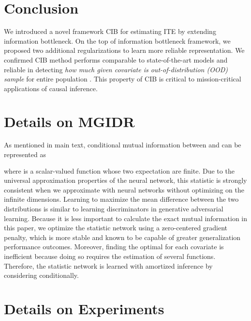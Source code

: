 \documentclass{article}
\begin{document}
\section{Conclusion}
    \vspace{-.15cm}
    We introduced a novel framework CIB for estimating ITE by extending information bottleneck. On the top of information bottleneck framework, we proposed two additional regularizations to learn more reliable representation. We confirmed CIB method performs comparable to state-of-the-art models and reliable in detecting \textit{how much given covariate  is out-of-distribution (OOD) sample} for entire population . This property of CIB is critical to mission-critical applications of causal inference.








\newpage
\appendix
\section{Details on MGIDR}
    As mentioned in main text, conditional mutual information between  and  can be represented as
    
    where  is a scalar-valued function whose two expectation are finite. Due to the universal approximation properties of the neural network, this statistic is strongly consistent when we approximate  with neural networks without optimizing on the infinite dimensions\cite{Belghazi18}. Learning to maximize the mean difference between the two distributions is similar to learning discriminators in generative adversarial learning. Because it is less important to calculate the exact mutual information in this paper, we optimize the statistic network  using a zero-centered gradient penalty\cite{Thanh19}, which is more stable and known to be capable of greater generalization performance outcomes. Moreover, finding the optimal  for each covariate  is inefficient because doing so requires the estimation of several functions. Therefore, the statistic network is learned with amortized inference by considering  conditionally.

\section{Details on Experiments}   
\end{document}
